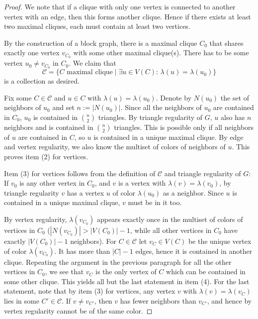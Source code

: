 \documentclass[a4paper, 11pt]{amsart}
\numberwithin{theorem}{section}
\newcommand{\cC}{\mathcal{C}}
\begin{document}
\begin{proof}
    We note that if a clique with only one vertex is connected to
    another vertex with an edge, then this forms another clique. Hence
    if there exists at least two maximal cliques, each must contain at least two vertices. 

    By the construction of a block graph, there is a maximal clique
    $C_0$ that shares exactly one vertex $v_{C_0}$ with some other
    maximal clique(s). There has to be some vertex $u_0\neq v_{C_0}$
    in $C_0$. We claim that 
    \[ \mathcal{C} = \lbrace C\text{ maximal
    clique}\mid \exists u\in V(C):\, \lambda(u) = \lambda(u_0)
    \rbrace \] is a collection as desired. 

    Fix some $C\in \mathcal{C}$ and $u\in C$ with $\lambda(u) =
    \lambda(u_0)$. Denote by $N(u_0)$ the set of neighbors of $u_0$
    and set $n := |N(u_0)|$. Since all the neighbors of $u_0$ are
    contained in $C_0$, $u_0$ is contained in $\binom{n}{2}$
    triangles. By triangle regularity of $G$, $u$ also has $n$
    neighbors and is contained in $\binom{n}{2}$ triangles. This is
    possible only if all neighbors of $u$ are contained in $C$, so $u$
    is contained in a unique maximal clique. By edge and vertex regularity, we also know the multiset of colors of neighbors of $u$. This proves item (2) for vertices. 

    Item (3) for vertices follows from the definition of $\mathcal{C}$
    and triangle regularity of $G$: If $v_0$ is any other vertex in $C_0$, and $v$ is a vertex with $\lambda(v) = \lambda(v_0)$, by triangle regularity $v$ has a vertex $u$ of color $\lambda(u_0)$ as a neighbor. Since $u$ is contained in a unique maximal clique, $v$ must be in it too.
    
    By vertex regularity, $\lambda (v_{C_0})$ appears exactly once
    in the multiset of colors of vertices in $C_0$ ($|N(v_{C_0})|
    > |V(C_0)|-1$, while all other vertices in $C_0$ have exactly
    $|V(C_0)|-1$ neighbors). For $C \in \cC$ let $v_C\in V(C)$ be the
    unique vertex of color $\lambda(v_{C_0})$. It has more than $|C|-1$
    edges, hence it is contained in another clique. Repeating the argument
    in the previous paragraph for all the other vertices in $C_0$, we
    see that $v_C$ is the only vertex of $C$ which can be contained in
    some other clique. This yields all but the last statement in item
    (4). For the last statement, note that by item (3) for vertices,
    any vertex $v$ with $\lambda(v)=\lambda(v_C)$ lies in some $C' \in
    \cC$. If $v \neq v_{C'}$, then $v$ has fewer neighbors than
    $v_{C'}$, and hence by vertex regularity cannot be of the same color. 


\end{proof}
\end{document}
